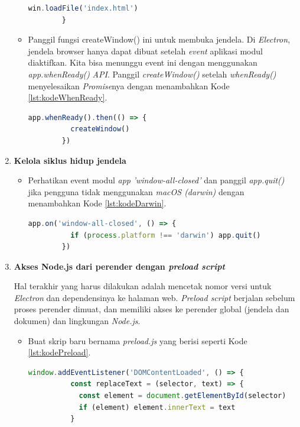 \begin{enumerate}
\begin{itemize}
\begin{lstlisting}[language=JavaScript, caption=Fungsi CreateWindow\label{lst:kodeCreateWindow}]
          win.loadFile('index.html')
        }
        \end{lstlisting}
        \item Panggil fungsi createWindow() ini untuk membuka jendela. Di \textit{Electron}, jendela browser hanya dapat dibuat setelah \textit{event} aplikasi modul diaktifkan. Kita bisa menunggu event ini dengan menggunakan \textit{app.whenReady()} \textit{API}. Panggil \textit{createWindow()} setelah \textit{whenReady()} menyelesaikan \textit{Promise}nya dengan menambahkan Kode \ref{lst:kodeWhenReady}.
        \begin{lstlisting}[language=JavaScript, caption=Memanggil fungsi createWindow\label{lst:kodeWhenReady}]
        app.whenReady().then(() => {
          createWindow()
        })
        \end{lstlisting}
    \end{itemize}
    \item \textbf{Kelola siklus hidup jendela}
    \begin{itemize}
        \item Perhatikan event modul \textit{app} \textit{'window-all-closed'} dan panggil \textit{app.quit()} jika pengguna tidak menggunakan \textit{macOS (darwin)} dengan menambahkan Kode \ref{lst:kodeDarwin}.
        \begin{lstlisting}[language=JavaScript, caption=Memanggil fungsi quit\label{lst:kodeDarwin}]
        app.on('window-all-closed', () => {
          if (process.platform !== 'darwin') app.quit()
        })
        \end{lstlisting}
    \end{itemize}
    \item \textbf{Akses Node.js dari perender dengan \textit{preload script}}
    
    Hal terakhir yang harus dilakukan adalah mencetak nomor versi untuk \textit{Electron} dan dependensinya ke halaman web. \textit{Preload script} berjalan sebelum proses perender dimuat, dan memiliki akses ke perender global (jendela dan dokumen) dan lingkungan \textit{Node.js}.
    \begin{itemize}
        \item Buat skrip baru bernama \textit{preload.js} yang berisi seperti Kode \ref{lst:kodePreload}.
        \begin{lstlisting}[language=JavaScript, caption=Kode \textit{preload.js}\label{lst:kodePreload}]
        window.addEventListener('DOMContentLoaded', () => {
          const replaceText = (selector, text) => {
            const element = document.getElementById(selector)
            if (element) element.innerText = text
          }
        

\end{lstlisting}
\end{itemize}
\end{enumerate}

